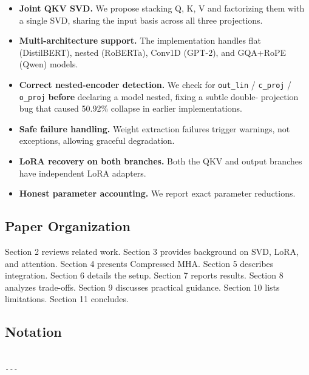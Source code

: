 \begin{itemize}
\item \textbf{Joint QKV SVD.} We propose stacking Q, K, V and factorizing them with a
  single SVD, sharing the input basis across all three projections.
\item \textbf{Multi-architecture support.} The implementation handles flat (DistilBERT),
  nested (RoBERTa), Conv1D (GPT-2), and GQA+RoPE (Qwen) models.
\item \textbf{Correct nested-encoder detection.} We check for \texttt{out\_lin} / \texttt{c\_proj} /
  \texttt{o\_proj} \textbf{before} declaring a model nested, fixing a subtle double-
  projection bug that caused 50.92\% collapse in earlier implementations.
\item \textbf{Safe failure handling.} Weight extraction failures trigger warnings, not
  exceptions, allowing graceful degradation.
\item \textbf{LoRA recovery on both branches.} Both the QKV and output branches have
  independent LoRA adapters.
\item \textbf{Honest parameter accounting.} We report exact parameter reductions.

\end{itemize}
\subsection{Paper Organization}

Section 2 reviews related work. Section 3 provides background on SVD, LoRA, 
and attention. Section 4 presents Compressed MHA. Section 5 describes 
integration. Section 6 details the setup. Section 7 reports results. Section 8 
analyzes trade-offs. Section 9 discusses practical guidance. Section 10 lists 
limitations. Section 11 concludes.



\subsection{Notation}

\begin{lstlisting}

---
\end{lstlisting}